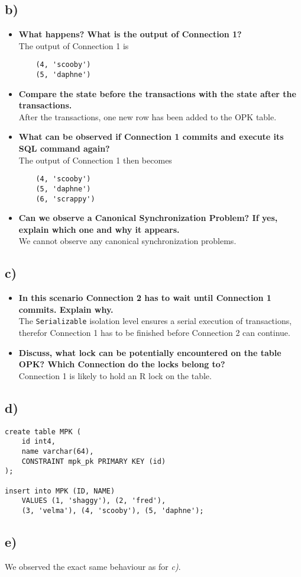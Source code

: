 \documentclass[a4paper,english,abstract=on]{scrartcl}
\begin{document}
\subsection*{b)}
	\begin{itemize}
		\item \textbf{What happens? What is the output of Connection 1?}\\
	The output of Connection 1 is
	\begin{lstlisting}
	(4, 'scooby')
	(5, 'daphne')
	\end{lstlisting}
	\item \textbf{Compare the state before the transactions with the state after the transactions.}\\
	After the transactions, one new row has been added to the OPK table.
	\item \textbf{What can be observed if Connection 1 commits and execute its SQL command again?}\\
	The output of Connection 1 then becomes
	\begin{lstlisting}
	(4, 'scooby')
	(5, 'daphne')
	(6, 'scrappy')
	\end{lstlisting}
	\item \textbf{Can we observe a Canonical Synchronization Problem? If yes, explain which one and why it appears.}\\
	We cannot observe any canonical synchronization problems.
\end{itemize}

\subsection*{c)}
\begin{itemize}
	\item \textbf{In this scenario Connection 2 has to wait until Connection 1 commits. Explain why.}\\
	The \texttt{Serializable} isolation level ensures a serial execution of transactions, therefor Connection 1 has to be finished before Connection 2 can continue.
	\item \textbf{Discuss, what lock can be potentially encountered on the table OPK? Which Connection do the locks belong to?}\\
	Connection 1 is likely to hold an R lock on the table.
\end{itemize}

\subsection*{d)}
\begin{lstlisting}
create table MPK (
	id int4,
	name varchar(64),
	CONSTRAINT mpk_pk PRIMARY KEY (id)
);

insert into MPK (ID, NAME) 
	VALUES (1, 'shaggy'), (2, 'fred'), 
	(3, 'velma'), (4, 'scooby'), (5, 'daphne');
\end{lstlisting}

\subsection*{e)}
We observed the exact same behaviour as for \textit{c)}.
\end{document}
